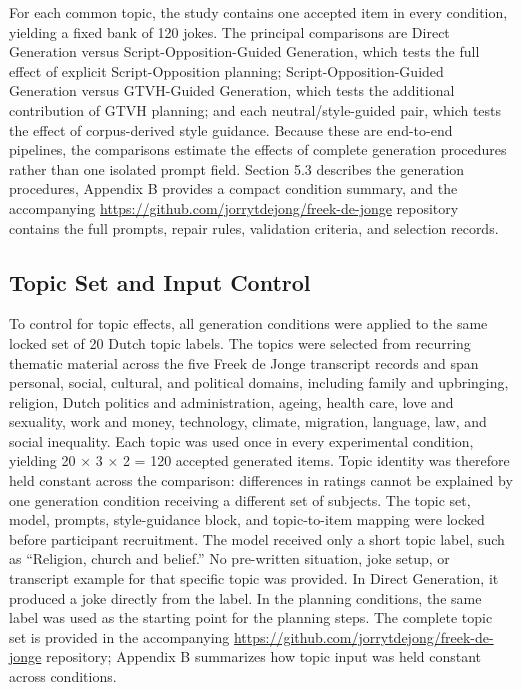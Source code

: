 \documentclass[11pt]{article}
\begin{document}
 For each common topic, the study contains one accepted item in every condition, yielding a fixed bank of 120 jokes. The principal comparisons are Direct Generation versus Script-Opposition-Guided Generation, which tests the full effect of explicit Script-Opposition planning; Script-Opposition-Guided Generation versus GTVH-Guided Generation, which tests the additional contribution of GTVH planning; and each neutral/style-guided pair, which tests the effect of corpus-derived style guidance. Because these are end-to-end pipelines, the comparisons estimate the effects of complete generation procedures rather than one isolated prompt field. Section 5.3 describes the generation procedures, Appendix B provides a compact condition summary, and the accompanying \url{https://github.com/jorrytdejong/freek-de-jonge} repository contains the full prompts, repair rules, validation criteria, and selection records.

\subsection{Topic Set and Input Control}\label{topic-set-and-input-control}

To control for topic effects, all generation conditions were applied to the same locked set of 20 Dutch topic labels. The topics were selected from recurring thematic material across the five Freek de Jonge transcript records and span personal, social, cultural, and political domains, including family and upbringing, religion, Dutch politics and administration, ageing, health care, love and sexuality, work and money, technology, climate, migration, language, law, and social inequality. Each topic was used once in every experimental condition, yielding 20 × 3 × 2 = 120 accepted generated items. Topic identity was therefore held constant across the comparison: differences in ratings cannot be explained by one generation condition receiving a different set of subjects. The topic set, model, prompts, style-guidance block, and topic-to-item mapping were locked before participant recruitment. The model received only a short topic label, such as ``Religion, church and belief.'' No pre-written situation, joke setup, or transcript example for that specific topic was provided. In Direct Generation, it produced a joke directly from the label. In the planning conditions, the same label was used as the starting point for the planning steps. The complete topic set is provided in the accompanying \url{https://github.com/jorrytdejong/freek-de-jonge} repository; Appendix B summarizes how topic input was held constant across conditions.
\end{document}
